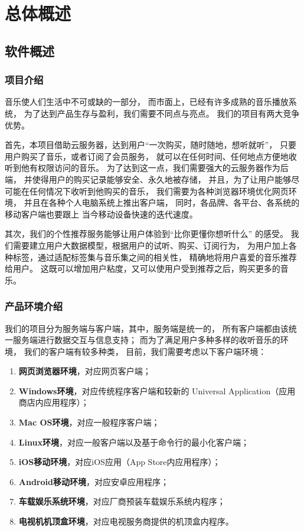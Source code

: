 
\chapter{总体概述}

\section{软件概述}
\subsection{项目介绍}

音乐使人们生活中不可或缺的一部分，
    而市面上，已经有许多成熟的音乐播放系统，
    为了达到产品生存与盈利，我们需要不同点与亮点。
我们的\proname 项目有两大竞争优势。

首先，本项目借助云服务器，达到用户“一次购买，随时随地，想听就听”，
    只要用户购买了音乐，或者订阅了会员服务，
    就可以在任何时间、任何地点方便地收听到他有权限访问的音乐。
为了达到这一点，我们需要强大的云服务器作为后端，
    并使得用户的购买记录能够安全、永久地被存储，
    并且，为了让用户能够尽可能在任何情况下收听到他购买的音乐，
    我们需要为各种浏览器环境优化网页环境，
    并且在各种个人电脑系统上推出客户端，
    同时，各品牌、各平台、各系统的移动客户端也要跟上
    当今移动设备快速的迭代速度。

其次，我们的个性推荐服务能够让用户体验到“\proname 比你更懂你想听什么”
    的感受。
    我们需要建立用户大数据模型，根据用户的试听、购买、订阅行为，
    为用户加上各种标签，通过适配标签集与音乐集之间的相关性，
    精确地将用户喜爱的音乐推荐给用户。
这既可以增加用户粘度，又可以使用户受到推荐之后，购买更多的音乐。

\subsection{产品环境介绍}

我们的项目分为服务端与客户端，其中，服务端是统一的，
    所有客户端都由该统一服务端进行数据交互与信息支持；
    而为了满足用户多种多样的收听音乐的环境，
    我们的客户端有较多种类，
    目前，我们需要考虑以下客户端环境：
    \begin{enumerate}
        \item \textbf{网页浏览器环境}，对应网页客户端；
        \item \textbf{Windows环境}，对应传统程序客户端和较新的
        Universal Application（应用商店内应用程序）；
        \item \textbf{Mac OS环境}，对应一般程序客户端；
        \item \textbf{Linux环境}，对应一般客户端以及基于命令行的最小化客户端；
        \item \textbf{iOS移动环境}，对应iOS应用（App Store内应用程序）；
        \item \textbf{Android移动环境}，对应安卓应用程序；
        \item \textbf{车载娱乐系统环境}，对应厂商预装车载娱乐系统内程序；
        \item \textbf{电视机机顶盒环境}，对应电视服务商提供的机顶盒内程序。
    \end{enumerate}

